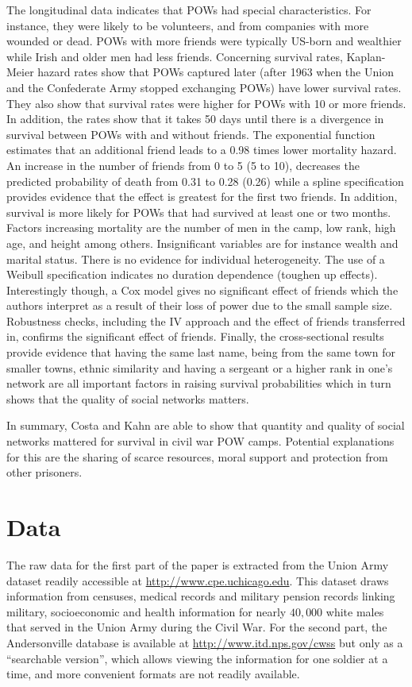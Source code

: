 \documentclass{article}
\begin{document}
The longitudinal data indicates that POWs had special characteristics. For instance, they were likely to be volunteers, and from companies with more wounded or dead. POWs with more friends were typically US-born and wealthier while Irish and older men had less friends. Concerning survival rates, Kaplan-Meier hazard rates show that POWs captured later (after 1963 when the Union and the Confederate Army stopped exchanging POWs) have lower survival rates. They also show that survival rates were higher for POWs with 10 or more friends. In addition, the rates show that it takes 50 days until there is a divergence in survival between POWs with and without friends. The exponential function estimates that an additional friend leads to a 0.98 times lower mortality hazard. An increase in the number of friends from 0 to 5 (5 to 10), decreases the predicted probability of death from 0.31 to 0.28 (0.26) while a spline specification provides evidence that the effect is greatest for the first two friends. In addition, survival is more likely for POWs that had survived at least one or two months. Factors increasing mortality are the number of men in the camp, low rank, high age, and height among others. Insignificant variables are for instance wealth and marital status. There is no evidence for individual heterogeneity. The use of a Weibull specification indicates no duration dependence (toughen up effects). Interestingly though, a Cox model gives no significant effect of friends which the authors interpret as a result of their loss of power due to the small sample size. Robustness checks, including the IV approach and the effect of friends transferred in, confirms the significant effect of friends. Finally, the cross-sectional results provide evidence that having the same last name, being from the same town for smaller towns, ethnic similarity and having a sergeant or a higher rank in one's network are all important factors in raising survival probabilities which in turn shows that the quality of social networks matters.

In summary, Costa and Kahn are able to show that quantity and quality of social networks mattered for survival in civil war POW camps. Potential explanations for this are the sharing of scarce resources, moral support and protection from other prisoners.

\section{Data}
The raw data for the first part of the paper is extracted from the Union Army dataset readily accessible at \url{http://www.cpe.uchicago.edu}. This dataset draws information from censuses, medical records and military pension records linking military, socioeconomic and health information for nearly $40,000$ white males that served in the Union Army during the Civil War. For the second part, the Andersonville database is available at \url{http://www.itd.nps.gov/cwss} but only as a ``searchable version'', which allows viewing the information for one soldier at a time, and more convenient formats are not readily available.
\end{document}
